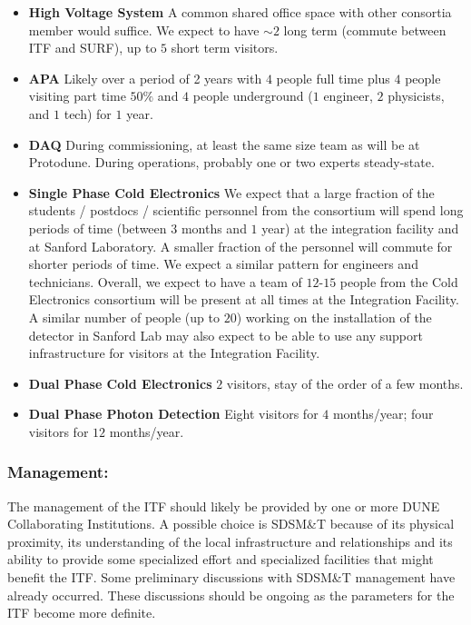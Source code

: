 \begin{itemize}
  \item {\bf High Voltage System} A common shared office space with other consortia member 
would suffice. We expect to have $\sim2$ long term (commute between ITF and SURF),
 up to $5$ short term visitors.
  \item {\bf APA} Likely over a period of 2 years with $4$ people full time plus $4$ people visiting 
part time $50\%$ and $4$ people underground ($1$ engineer, $2$ physicists, and $1$ tech) for
 $1$ year.
  \item {\bf DAQ} During commissioning, at least the same size team as will be at Protodune. 
 During operations, probably one or two experts steady-state.
  \item {\bf Single Phase Cold Electronics} We expect that a large fraction of the students / 
postdocs / scientific personnel from the consortium will spend long periods of time (between $3$ 
months and $1$ year) at the integration facility and at Sanford Laboratory. A smaller fraction of the 
personnel will commute for shorter periods of time. We expect a similar pattern for engineers and 
technicians. Overall, we expect to have a team of $12$-$15$ people from the Cold Electronics 
consortium will be present at all times at the Integration Facility. A similar number of people (up to 
$20$) working on the installation of the detector in Sanford Lab may also expect to be able to use 
any support infrastructure for visitors at the Integration Facility.
  \item {\bf Dual Phase Cold Electronics} $2$ visitors, stay of the order of a few months.
  \item {\bf Dual Phase Photon Detection} Eight visitors for $4$ months/year; 
four visitors for $12$ months/year.
\end{itemize}


\subsubsection{Management:}
The management of the ITF should likely be provided by one or more
DUNE Collaborating Institutions. A possible choice is SDSM\&T because
of its physical proximity, its understanding of the local
infrastructure and relationships and its ability to provide some
specialized effort and specialized facilities that might benefit
the ITF.  Some preliminary discussions with SDSM\&T management
have already occurred. These discussions should be ongoing as the
parameters for the ITF become more definite.


